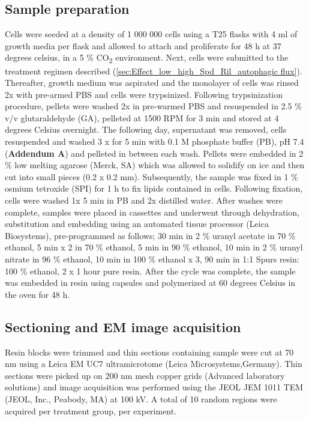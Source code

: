 \subsection{Sample preparation}
Cells were seeded at a density of 1 000 000 cells using a T25 flasks with 4 ml of growth media per flask and allowed to attach and proliferate for 48 h at 37 degrees  celsius, in a 5 \% CO\textsubscript{2} environment. Next, cells were submitted to the treatment regimen described (\cref{sec:Effect_low_high_Spd_Ril_autophagic flux}). Thereafter, growth medium was aspirated and the monolayer of cells was rinsed 2x with pre-armed PBS and cells were trypsinized. Following trypsinization procedure, pellets were washed 2x in pre-warmed PBS and resuspended in 2.5 \% v/v glutaraldehyde (GA), pelleted at 1500 RPM for 3 min and stored at 4 degrees Celsius overnight. The following day, supernatant was removed, cells resuspended and washed 3 x for 5 min with 0.1 M phosphate buffer (PB), pH 7.4 (\textbf{Addendum A}) and pelleted in between each wash. Pellets were embedded in 2 \% low melting agarose (Merck, SA) which was allowed to solidify on ice and then cut into small pieces (0.2 x 0.2 mm). Subsequently, the sample was fixed in 1 \% osmium tetroxide (SPI) for 1 h to fix lipids contained in cells. Following fixation, cells were washed 1x 5 min in PB and 2x distilled water. After washes were complete, samples were placed in cassettes and underwent through dehydration, substitution and embedding using an automated tissue processor (Leica Biosystems), pre-programmed as follows; 30 min in 2 \% uranyl acetate in 70 \% ethanol, 5 min x 2 in 70 \% ethanol, 5 min in 90 \% ethanol, 10 min in 2 \% uranyl nitrate in 96 \% ethanol, 10 min in 100 \% ethanol x 3, 90 min in 1:1 Spurs resin: 100 \% ethanol, 2 x 1 hour pure resin. After the cycle was complete, the sample was embedded in resin using capsules and polymerized at 60 degrees Celsius in the oven for 48 h.

\subsection{Sectioning and EM image acquisition}
Resin blocks were trimmed and thin sections containing sample were cut at 70 nm using a Leica EM UC7 ultramicrotome (Leica Microsystems,Germany). Thin sections were picked up on 200 nm mesh copper grids (Advanced laboratory solutions) and image acquisition was performed using the JEOL JEM 1011 TEM (JEOL, Inc., Peabody, MA) at 100 kV. A total of 10 random regions were acquired per treatment group, per experiment.  

